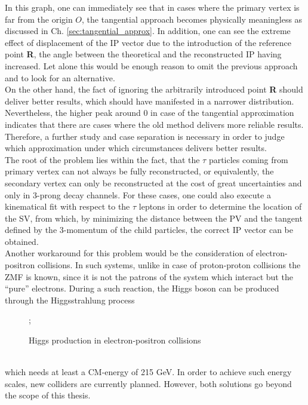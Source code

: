 In this graph, one can immediately see that in cases where the primary vertex is far from the origin $O$, the tangential approach becomes physically meaningless as discussed in Ch. \ref{sec:tangential_approx}. In addition, one can see the extreme effect of displacement of the IP vector due to the introduction of the reference point \textbf{R}, the angle between the theoretical and the reconstructed IP having increased. Let alone this would be enough reason to omit the previous approach and to look for an alternative.\\
On the other hand, the fact of ignoring the arbitrarily introduced point \textbf{R} should deliver better results, which should have manifested in a narrower distribution. Nevertheless, the higher peak around 0 in case of the tangential approximation indicates that there are cases where the old method delivers more reliable results. Therefore, a further study and case separation is necessary in order to judge which approximation under which circumstances delivers better results.\\
The root of the problem lies within the fact, that the $\tau$ particles coming from primary vertex can not always be fully reconstructed, or equivalently, the secondary vertex can only be reconstructed at the cost of great uncertainties and only in 3-prong decay channels. For these cases, one could also execute a kinematical fit with respect to the $\tau$ leptons in order to determine the location of the SV, from which, by minimizing the distance between the PV and the tangent defined by the 3-momentum of the child particles, the correct IP vector can be obtained.\\
Another workaround for this problem would be the consideration of electron-positron collisions. In such systems, unlike in case of proton-proton collisions the ZMF is known, since it is not the patrons of the system which interact but the ``pure'' electrons. During a such reaction, the Higgs boson can be produced through the Higgsstrahlung process\\
\begin{figure}[h]
	\centering
	;
	\caption{Higgs production in electron-positron collisions}
\end{figure}\\
which needs at least a CM-energy of 215 GeV. In order to achieve such energy scales, new colliders are currently planned. However, both solutions go beyond the scope of this thesis.